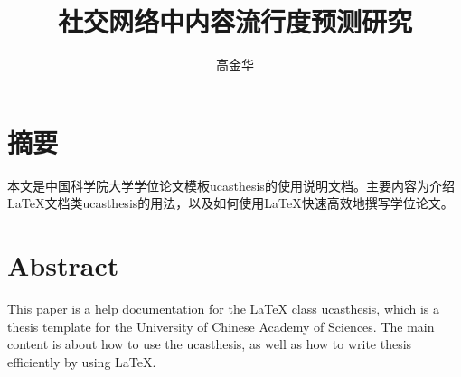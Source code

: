   \confidential{}%
  \title[社交网络中内容流行度预测研究]{社交网络中内容流行度预测研究}%
  \author{高金华}%
\maketitle
\makeenglishtitle
\makedeclaration
\chapter{摘\quad 要}%
本文是中国科学院大学学位论文模板ucasthesis的使用说明文档。主要内容为介绍\LaTeX{}文档类ucasthesis的用法，以及如何使用\LaTeX{}快速高效地撰写学位论文。



\chapter{Abstract}%
This paper is a help documentation for the \LaTeX{} class ucasthesis, which is  a thesis template for the University of Chinese Academy of Sciences. The main content is about how to use the ucasthesis, as well as how to write thesis efficiently by using \LaTeX{}.

